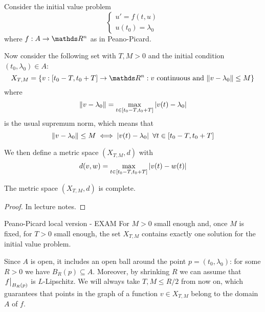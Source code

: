 \documentclass[12pt]{extarticle}
\begin{document}
Consider the initial value problem
\begin{equation}
	\begin{cases}
		u' = f(t, u) \\
		u(t_0) = \lambda_0
	\end{cases}
\end{equation}
where $f: A \to \R^n$ as in Peano-Picard.

Now consider the following set with $T, M > 0$ and the initial condition $(t_0, \lambda_0) \in A$:
\begin{equation}
	X_{T, M} = \{ v: [t_0 - T, t_0 + T] \to \R^n : v \text{ continuous and } \norm{v-\lambda_0} \leq M \}
\end{equation}
where
\begin{equation}
	\norm{v-\lambda_0} = \max_{t \in [t_0 - T, t_0 + T]} \abs{v(t) - \lambda_0}
\end{equation}
is the usual supremum norm, which means that
\begin{equation}
	\norm{v - \lambda_0} \leq M \iff \abs{v(t) - \lambda_0} \enspace \forall t \in [t_0 - T, t_0 + T]
\end{equation}

We then define a metric space $(X_{T, M}, d)$ with
\begin{equation}
	d(v, w) = \max_{t \in [t_0 - T, t_0 + T]} \abs{v(t) - w(t)}
\end{equation}

\begin{proposition}{}{}
	The metric space $(X_{T,M}, d)$ is complete.
\end{proposition}

\begin{proof}
	In lecture notes.
\end{proof}

\begin{theorem}{Peano-Picard local version - EXAM}{}
	For $M > 0$ small enough and, once $M$ is fixed, for $T>0$ small enough, the set $X_{T, M}$ contains exactly one solution
	for the initial value problem.
\end{theorem}

Since $A$ is open, it includes an open ball around the point $p = (t_0, \lambda_0)$:
for some $R > 0$ we have $B_R(p) \subseteq A$.
Moreover, by shrinking $R$ we can assume that $\eval{f}_{B_R(p)}$ is $L$-Lipschitz.
We will always take $T, M \leq R/2$ from now on, which guarantees that points in the graph of a function $v \in X_{T, M}$ belong to the domain $A$ of $f$.
\end{document}
